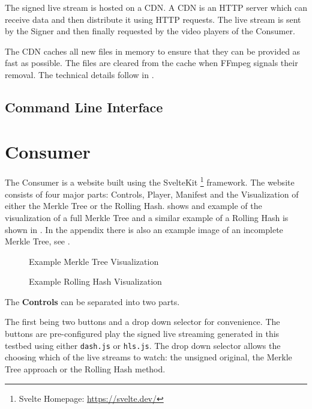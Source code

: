 The signed live stream is hosted on a CDN. A CDN is an HTTP server which can receive data and then distribute it using HTTP requests. The live stream is sent by the Signer and then finally requested by the video players of the Consumer.

The CDN caches all new files in memory to ensure that they can be provided as fast as possible. The files are cleared from the cache when FFmpeg signals their removal. The technical details follow in .

\subsection{Command Line Interface\label{sec:cli_cdn}}


\section{Consumer\label{sec:consumer}}

The Consumer is a website built using the SvelteKit \footnote{Svelte Homepage: \url{https://svelte.dev/}} framework. The website consists of four major parts: Controls, Player, Manifest and the Visualization of either the Merkle Tree or the Rolling Hash.  shows and example of the visualization of a full Merkle Tree and a similar example of a Rolling Hash is shown in . In the appendix there is also an example image of an incomplete Merkle Tree, see .

\begin{figure}
    \caption{Example Merkle Tree Visualization}
    \label{fig:merkle_tree}
\end{figure}
\begin{figure}
    \caption{Example Rolling Hash Visualization}
    \label{fig:rolling_hash}
\end{figure}

The \textbf{Controls} can be separated into two parts. 

The first being two buttons and a drop down selector for convenience. The buttons are pre-configured play the signed live streaming generated in this testbed using either \texttt{dash.js} or \texttt{hls.js}. The drop down selector allows the choosing which of the live streams to watch: the unsigned original, the Merkle Tree approach or the Rolling Hash method.

